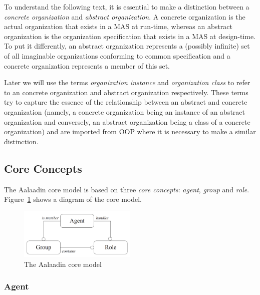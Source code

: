 To understand the following text, it is essential to make a distinction between a \textit{concrete organization} and \textit{abstract organization}.
A concrete organization is the actual organization that exists in a MAS at run-time, whereas an abstract organization is the organization specification that exists in a MAS at design-time.
To put it differently, an abstract organization represents a (possibly infinite) set of all imaginable organizations conforming to common specification and a concrete organization represents a member of this set.

Later we will use the terms \textit{organization instance} and \textit{organization class} to refer to an concrete organization and abstract organization respectively.
These terms try to capture the essence of the relationship between an abstract and concrete organization (namely, a concrete organization being an instance of an abstract organization and conversely, an abstract organization being a class of a concrete organization) and are imported from OOP where it is necessary to make a similar distinction. 

\subsection{Core Concepts}

The Aalaadin core model is based on three \textit{core concepts}: \textit{agent}, \textit{group} and \textit{role}.
Figure~\ref{figure:aalaadin-core-model} shows a diagram of the core model.

\begin{figure}[h]
	\centering
	\includegraphics[width=0.5\textwidth]{images/aalaadin/core-model.png}
	\caption{The Aalaadin core model}
	\label{figure:aalaadin-core-model}
\end{figure}

\subsubsection*{Agent}

